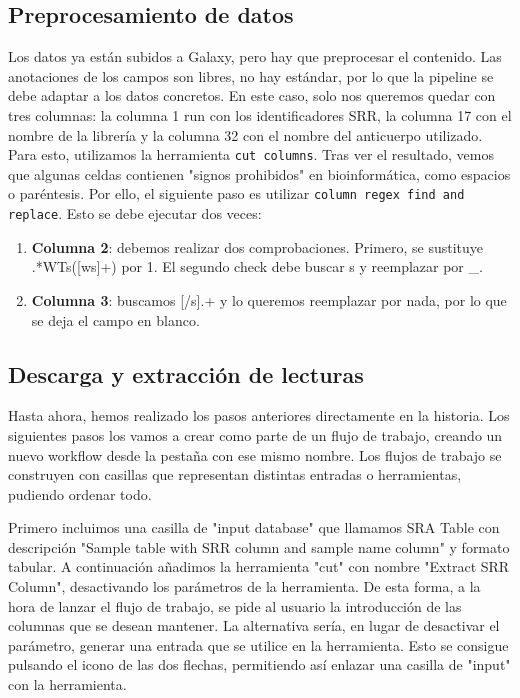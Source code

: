\subsection{Preprocesamiento de datos}
Los datos ya están subidos a Galaxy, pero hay que preprocesar el contenido. Las anotaciones de los campos son libres, no hay estándar, por lo que la pipeline se debe adaptar a los datos concretos. 
En este caso, solo nos queremos quedar con tres columnas: la columna 1 run con los identificadores SRR, la columna 17 con el nombre de la librería y la columna 32 con el nombre del anticuerpo utilizado. Para esto, utilizamos la herramienta \texttt{cut columns}. Tras ver el resultado, vemos que algunas celdas contienen "signos prohibidos" en bioinformática, como espacios o paréntesis. Por ello, el siguiente paso es utilizar \texttt{column regex find and replace}. Esto se debe ejecutar dos veces:
\begin{enumerate}
\item \textbf{Columna 2}: debemos realizar dos comprobaciones. Primero, se sustituye .*WTs([ws]+) por 1. El segundo check debe buscar s y reemplazar por \_.
\item \textbf{Columna 3}: buscamos [/s].+ y lo queremos reemplazar por nada, por lo que se deja el campo en blanco.
\end{enumerate}

\subsection{Descarga y extracción de lecturas}
Hasta ahora, hemos realizado los pasos anteriores directamente en la historia. Los siguientes pasos los vamos a crear como parte de un flujo de trabajo, creando un nuevo workflow desde la pestaña con ese mismo nombre. Los flujos de trabajo se construyen con casillas que representan distintas entradas o herramientas, pudiendo ordenar todo.

Primero incluimos una casilla de "input database" que llamamos SRA Table con descripción "Sample table with SRR column and sample name column" y formato tabular. A continuación añadimos la herramienta "cut" con nombre "Extract SRR Column", desactivando los parámetros de la herramienta. De esta forma, a la hora de lanzar el flujo de trabajo, se pide al usuario la introducción de las columnas que se desean mantener. La alternativa sería, en lugar de desactivar el parámetro, generar una entrada que se utilice en la herramienta. Esto se consigue pulsando el icono de las dos flechas, permitiendo así enlazar una casilla de "input" con la herramienta.

